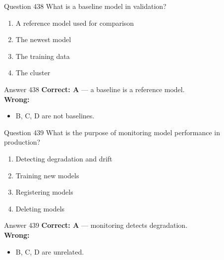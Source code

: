 \documentclass[aspectratio=169,11pt]{beamer}
\begin{document}
	\begin{frame}{Question 438}
		What is a baseline model in validation?
		\begin{enumerate}[label=\Alph*.]
			\item A reference model used for comparison
			\item The newest model
			\item The training data
			\item The cluster
		\end{enumerate}
	\end{frame}
	\begin{frame}{Answer 438}
		\textbf{Correct: A} --- a baseline is a reference model.\\
		\vspace{0.5em}
		\textbf{Wrong:}
		\begin{itemize}
			\item B, C, D are not baselines.
		\end{itemize}
	\end{frame}
	
	\begin{frame}{Question 439}
		What is the purpose of monitoring model performance in production?
		\begin{enumerate}[label=\Alph*.]
			\item Detecting degradation and drift
			\item Training new models
			\item Registering models
			\item Deleting models
		\end{enumerate}
	\end{frame}
	\begin{frame}{Answer 439}
		\textbf{Correct: A} --- monitoring detects degradation.\\
		\vspace{0.5em}
		\textbf{Wrong:}
		\begin{itemize}
			\item B, C, D are unrelated.
		\end{itemize}
	\end{frame}
	
\end{document}
